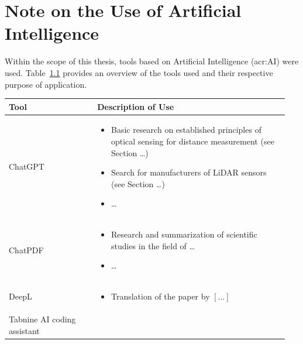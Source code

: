 \chapter{Note on the Use of Artificial Intelligence}


Within the scope of this thesis, tools based on Artificial Intelligence (\acrshort{acr:AI}) were used. Table~\ref{tab:anhang_uebersicht_KI_werkzeuge} provides an overview of the tools used and their respective purpose of application.

\begin{table}[hbt]	
	\centering
	\renewcommand{\arraystretch}{1.5}	%
	\label{tab:anhang_uebersicht_KI_werkzeuge}
	\begin{tabular}{>{\raggedright\arraybackslash}p{0.3\linewidth} >{\raggedright\arraybackslash}p{0.65\linewidth}}
		\textbf{Tool} & \textbf{Description of Use}\\
		\hline 
		\hline
		ChatGPT & 	\vspace{-\topsep}
		\begin{itemize}[noitemsep,topsep=0pt,partopsep=0pt,parsep=0pt] 
			\item Basic research on established principles of optical sensing for distance measurement (see Section \ldots)
			\item Search for manufacturers of LiDAR sensors (see Section \ldots)
			\item \ldots
		\end{itemize} \\
		ChatPDF &	\vspace{-\topsep}
		\begin{itemize}[noitemsep,topsep=0pt,partopsep=0pt,parsep=0pt] 
			\item Research and summarization of scientific studies in the field of \ldots
			\item \ldots
		\end{itemize} \\ 
		DeepL	&	\vspace{-\topsep}
		\begin{itemize}[noitemsep,topsep=0pt,partopsep=0pt,parsep=0pt] 
			\item Translation of the paper by $[\ldots]$
		\end{itemize} \\ 
		Tabnine AI coding assistant &	\vspace{-\topsep}

\end{tabular}
\end{table}
